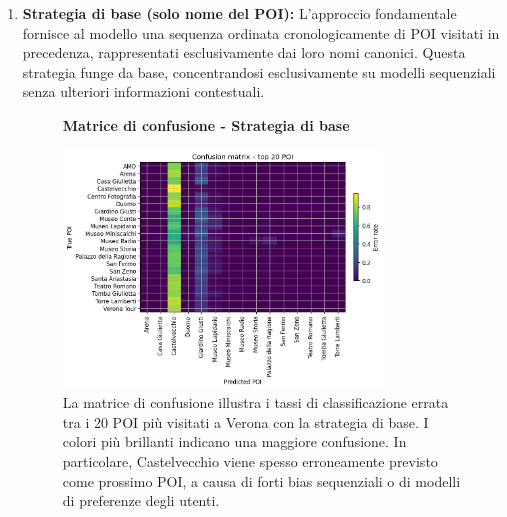 \begin{enumerate}

\item \textbf{Strategia di base (solo nome del POI):} L'approccio fondamentale fornisce al modello una sequenza ordinata cronologicamente di POI visitati in precedenza, rappresentati esclusivamente dai loro nomi canonici. Questa strategia funge da base, concentrandosi esclusivamente su modelli sequenziali senza ulteriori informazioni contestuali.
\begin{figure}[H]
\centering
\textbf{Matrice di confusione - Strategia di base}\par
\vspace{0.5em}
\includegraphics[width=0.8\textwidth]{../../img/no_SPACE-GEO_n-1_come_current_POI/confusion_matrix.png}
\caption{La matrice di confusione illustra i tassi di classificazione errata tra i 20 POI più visitati a Verona con la strategia di base. I colori più brillanti indicano una maggiore confusione. In particolare, Castelvecchio viene spesso erroneamente previsto come prossimo POI, a causa di forti bias sequenziali o di modelli di preferenze degli utenti.
}
\label{fig:baseline_confusion}
\end{figure}


\end{enumerate}
